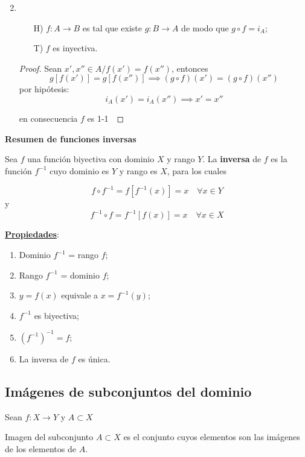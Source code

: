 \begin{fmd-example}
	\begin{enumerate}
		\setcounter{enumi}{1}
		\item \begin{itemize}
			\item[H)] $f: A \rightarrow B$ es tal que existe $g:B \rightarrow A$ de modo
			que $g \circ f = i_A$;
			\item[T)] $f$ es inyectiva.
		\end{itemize}\vspace{3mm}
		\begin{proof}
			Sean $x', x'' \in A / f(x') = f(x'')$, entonces
			\[ g[f(x')] = g[f(x'')] \implies (g \circ f)(x') = (g \circ f)(x'') \]
			por hipótesis: \[i_A(x') = i_A(x'') \implies x' = x''\]
			
			en consecuencia $f$ es 1-1\
		\end{proof}
	\end{enumerate}
\end{fmd-example}

\textbf{Resumen de funciones inversas}
\begin{fmd-definition}
	Sea $f$ una función biyectiva con dominio $X$ y rango $Y$. La \textbf{inversa}
	de $f$ es la función $f^{-1}$ cuyo dominio es $Y$ y rango es $X$, para los cuales
	
	\[ f \circ f^{-1} = f[f^{-1}(x)] = x \quad \forall x \in Y \]
	y \[ f^{-1} \circ f = f^{-1}[f(x)] = x  \quad \forall x \in X\]
\end{fmd-definition}

\underline{\textbf{Propiedades}}:

		\begin{enumerate}[label=\roman*)]
			\item Dominio $f^{-1}$ = rango $f$;
			\item Rango $f^{-1}$ = dominio $f$;
			\item $y = f(x)$ equivale a $x = f^{-1}(y)$;

			\setcounter{enumi}{3}
			\item $f^{-1}$ es biyectiva;
			\item $(f^{-1})^{-1} = f$;
			\item La inversa de $f$ es única.
		\end{enumerate}


\subsection{Imágenes de subconjuntos del dominio} \label{sec:imasub}
Sean $f : X \rightarrow Y$ y $A \subset X$
\begin{fmd-definition}
	Imagen del subconjunto $A \subset X$ es el conjunto cuyos elementos son las
	imágenes de los elementos de $A$.
\end{fmd-definition}

